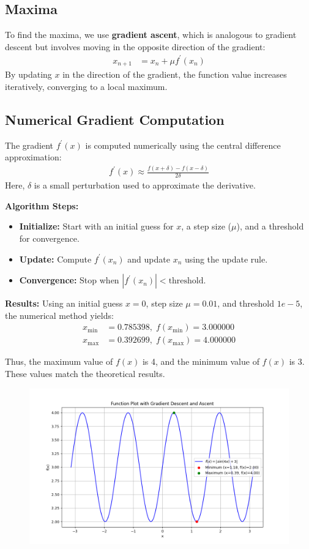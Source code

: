 \documentclass[journal]{IEEEtran}
\begin{document}
\subsection*{Maxima}  
To find the maxima, we use \textbf{gradient ascent}, which is analogous to gradient descent but involves moving in the opposite direction of the gradient:  
\begin{align}
    x_{n+1} &= x_n + \mu f^{\prime}(x_n)
\end{align}  
By updating \(x\) in the direction of the gradient, the function value increases iteratively, converging to a local maximum.  

\subsection*{Numerical Gradient Computation}  
The gradient \(f^{\prime}(x)\) is computed numerically using the central difference approximation:  
\begin{align}
    f^{\prime}(x) \approx \frac{f(x + \delta) - f(x - \delta)}{2\delta}
\end{align}  
Here, \(\delta\) is a small perturbation used to approximate the derivative.

\noindent \textbf{Algorithm Steps:}
\begin{itemize}
    \item \textbf{Initialize:} Start with an initial guess for \(x\), a step size (\(\mu\)), and a threshold for convergence.
    \item \textbf{Update:} Compute \(f^{\prime}(x_n)\) and update \(x_n\) using the update rule.
    \item \textbf{Convergence:} Stop when \(|f^{\prime}(x_n)| < \text{threshold}\).
\end{itemize}

\noindent \textbf{Results:}  
Using an initial guess \(x = 0\), step size \(\mu = 0.01\), and threshold \(1e-5\), the numerical method yields:
\begin{align}
    x_{\text{min}} &= 0.785398, \; f(x_{\text{min}}) = 3.000000\\
    x_{\text{max}} &= 0.392699, \; f(x_{\text{max}}) = 4.000000
\end{align}

Thus, the maximum value of \(f(x)\) is 4, and the minimum value of \(f(x)\) is 3. These values match the theoretical results.

\begin{figure}[h!]
   \centering
   \includegraphics[width=0.7\columnwidth]{figs/fig.png}
\end{figure}
\end{document}
